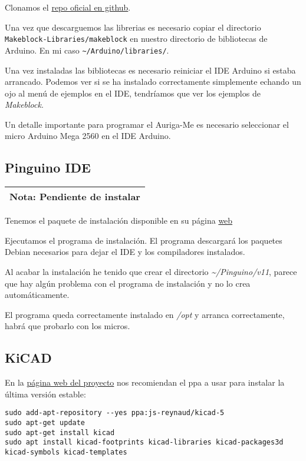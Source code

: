 \documentclass[
  12pt,
  spanish,
]{article}
\begin{document}
Clonamos el
\href{https://github.com/Makeblock-official/Makeblock-Libraries}{repo
oficial en github}.

Una vez que descarguemos las librerias es necesario copiar el directorio
\texttt{Makeblock-Libraries/makeblock} en nuestro directorio de
bibliotecas de Arduino. En mi caso
\texttt{\textasciitilde{}/Arduino/libraries/}.

Una vez instaladas las bibliotecas es necesario reiniciar el IDE Arduino
si estaba arrancado. Podemos ver si se ha instalado correctamente
simplemente echando un ojo al menú de ejemplos en el IDE, tendríamos que
ver los ejemplos de \emph{Makeblock}.

Un detalle importante para programar el Auriga-Me es necesario
seleccionar el micro Arduino Mega 2560 en el IDE Arduino.

\hypertarget{pinguino-ide}{%
\subsection{Pinguino IDE}\label{pinguino-ide}}

\begin{longtable}[]{@{}l@{}}
\toprule
\endhead
\textbf{Nota}: Pendiente de instalar\tabularnewline
\bottomrule
\end{longtable}

Tenemos el paquete de instalación disponible en su página
\href{http://pinguino.cc/download.php}{web}

Ejecutamos el programa de instalación. El programa descargará los
paquetes Debian necesarios para dejar el IDE y los compiladores
instalados.

Al acabar la instalación he tenido que crear el directorio
\emph{\textasciitilde/Pinguino/v11}, parece que hay algún problema con
el programa de instalación y no lo crea automáticamente.

El programa queda correctamente instalado en \emph{/opt} y arranca
correctamente, habrá que probarlo con los micros.

\hypertarget{kicad}{%
\subsection{KiCAD}\label{kicad}}

En la \href{http://kicad-pcb.org/download/linux-mint/}{página web del
proyecto} nos recomiendan el ppa a usar para instalar la última versión
estable:

\begin{verbatim}
sudo add-apt-repository --yes ppa:js-reynaud/kicad-5
sudo apt-get update
sudo apt-get install kicad
sudo apt install kicad-footprints kicad-libraries kicad-packages3d kicad-symbols kicad-templates
\end{verbatim}
\end{document}
